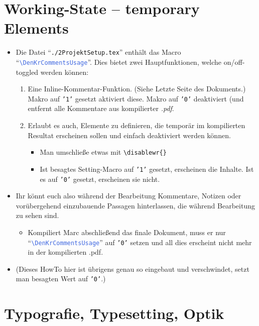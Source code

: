 \section*{Working-State -- temporary Elements}

\begin{itemize}
    \item Die Datei \enquote{\textcolor{PineGreen}{\texttt{./2ProjektSetup.tex}}} enthält das Macro \enquote{\textcolor{RoyalBlue}{\texttt{\textbackslash DenKrCommentsUsage}}}. Dies bietet zwei Hauptfunktionen, welche on/off-toggled werden können:
    \begin{enumerate}
        \item Eine Inline-Kommentar-Funktion. (Siehe Letzte Seite des Dokuments.) Makro auf \texttt{'1'} gesetzt aktiviert diese. Makro auf \texttt{'0'} deaktiviert (und entfernt alle Kommentare aus kompilierter \textit{.pdf}.
        \item Erlaubt es auch, Elemente zu definieren, die temporär im kompilierten Resultat erscheinen sollen und einfach deaktiviert werden können.
        \begin{itemize}
            \item Man umschließe etwas mit \texttt{\textcolor{Bittersweet}{\textbackslash disablewr}\{\}}
            \item Ist besagtes Setting-Macro auf \texttt{'1'} gesetzt, erscheinen die Inhalte. Ist es auf \texttt{'0'} gesetzt, erscheinen sie nicht.
        \end{itemize}
    \end{enumerate}
    \item[\labpragAsym] Ihr könnt euch also während der Bearbeitung Kommentare, Notizen oder vorübergehend einzubauende Passagen hinterlassen, die während Bearbeitung zu sehen sind.
    \begin{itemize}
        \item Kompiliert Marc abschließend das finale Dokument, muss er nur \enquote{\textcolor{RoyalBlue}{\texttt{\textbackslash DenKrCommentsUsage}}} auf \texttt{'0'} setzen und all dies erscheint nicht mehr in der kompilierten .pdf.
    \end{itemize}
    \item (Dieses HowTo hier ist übrigens genau so eingebaut und verschwindet, setzt man besagten Wert auf \texttt{'0'}.)
\end{itemize}




\section*{Typografie, Typesetting, Optik}

